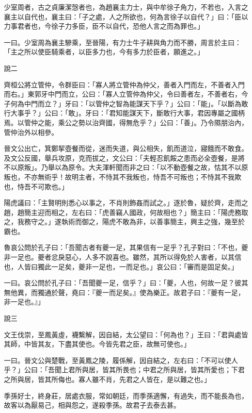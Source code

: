 \begin{pinyinscope}
少室周者，古之貞廉潔愨者也，為趙襄主力士，與中牟徐子角力，不若也，入言之襄主以自代也，襄主曰：「子之處，人之所欲也，何為言徐子以自代？」曰：「臣以力事君者也，今徐子力多臣，臣不以自代，恐他人言之而為罪也。」

一曰。少室周為襄主驂乘，至晉陽，有力士牛子耕與角力而不勝，周言於主曰：「主之所以使臣騎乘者，以臣多力也，今有多力於臣者，願進之。」

說二

齊桓公將立管仲，令群臣曰：「寡人將立管仲為仲父，善者入門而左，不善者入門而右。」東郭牙中門而立，公曰：「寡人立管仲為仲父，令曰善者左，不善者右，今子何為中門而立？」牙曰：「以管仲之智為能謀天下乎？」公曰：「能」。「以斷為敢行大事乎？」公曰：「敢」。牙曰：「君知能謀天下，斷敢行大事，君因專屬之國柄焉。以管仲之能，乘公之勢以治齊國，得無危乎？」公曰：「善」。乃令隰朋治內，管仲治外以相參。

晉文公出亡，箕鄭挈壺餐而從，迷而失道，與公相失，飢而道泣，寢餓而不敢食。及文公反國，舉兵攻原，克而拔之，文公曰：「夫輕忍飢餒之患而必全壺餐，是將不以原叛」。乃舉以為原令。大夫渾軒聞而非之曰：「以不動壺餐之故，怙其不以原叛也，不亦無術乎！故明主者，不恃其不我叛也，恃吾不可叛也；不恃其不我欺也，恃吾不可欺也。」

陽虎議曰：「主賢明則悉心以事之，不肖則飾姦而試之。」逐於魯，疑於齊，走而之趙，趙簡主迎而相之，左右曰：「虎善竊人國政，何故相也？」簡主曰：「陽虎務取之，我務守之。」遂執術而御之，陽虎不敢為非，以善事簡主，興主之強，幾至於霸也。

魯哀公問於孔子曰：「吾聞古者有夔一足，其果信有一足乎？孔子對曰：「不也，夔非一足也。夔者忿戾惡心，人多不說喜也。雖然，其所以得免於人害者，以其信也，人皆曰獨此一足矣，夔非一足也，一而足也。」哀公曰：「審而是固足矣。」

一曰。哀公問於孔子曰：「吾聞夔一足，信乎？」曰：「夔，人也，何故一足？彼其無他異，而獨通於聲，堯曰：『夔一而足矣。』使為樂正。故君子曰：『夔有一足，非一足也。』」

說三

文王伐崇，至鳳黃虛，襪繫解，因自結，太公望曰：「何為也？」王曰：「君與處皆其師，中皆其友，下盡其使也。今皆先君之臣，故無可使也。」

一曰。晉文公與楚戰，至黃鳳之陵，履係解，因自結之，左右曰：「不可以使人乎？」公曰：「吾聞上君所與居，皆其所畏也；中君之所與居，皆其所愛也；下君之所與居，皆其所侮也。寡人雖不肖，先君之人皆在，是以難之也。」

季孫好士，終身莊，居處衣服，常如朝廷，而季孫適懈，有過失，而不能長為也，故客以為厭易己，相與怨之，遂殺季孫。故君子去泰去甚。


\end{pinyinscope}
